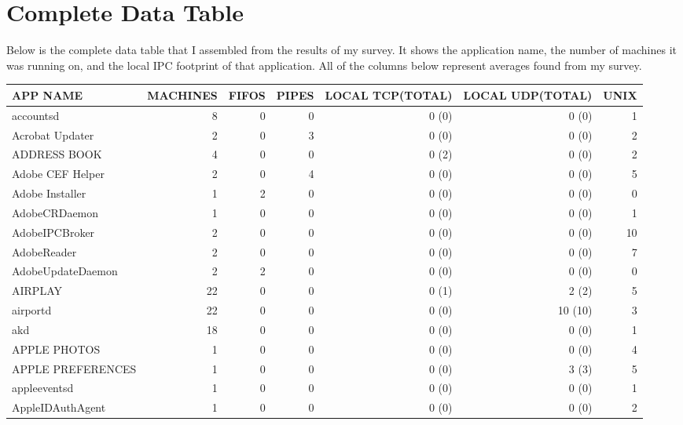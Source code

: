 \chapter{Complete Data Table}
\label{appendix:allData}
Below is the complete data table that I assembled from the results of my survey.  It shows the application name, the number of machines it was running on, and the local IPC footprint of that application.  All of the columns below represent averages found from my survey.


\setlength\LTleft{-1in}
\setlength{\tabcolsep}{3.4pt}
\begin{adjustwidth}{-2in}{}
\begin{scriptsize}
\begin{longtable}[l]{ l | r | r | r | r | r | r }
    \hline
    APP NAME &  MACHINES &  FIFOS &  PIPES & LOCAL TCP(TOTAL) & LOCAL UDP(TOTAL) & UNIX \\ \hline
    \endhead
    accountsd &  8 &  0 &  0 &  0 (0) &  0 (0) &  1 \\ \hline
    Acrobat Updater & 2 &  0 &  3 &  0 (0) &  0 (0) &  2 \\ \hline
    ADDRESS BOOK & 4 &  0 &  0 &  0 (2) &  0 (0) &  2 \\ \hline
    Adobe CEF Helper & 2 &  0 &  4 &  0 (0) &  0 (0) &  5 \\ \hline
    Adobe Installer & 1 &  2 &  0 &  0 (0) &  0 (0) &  0 \\ \hline
    AdobeCRDaemon &  1 &  0 &  0 &  0 (0) &  0 (0) &  1 \\ \hline
    AdobeIPCBroker & 2 &  0 &  0 &  0 (0) &  0 (0) & 10 \\ \hline
    AdobeReader &  2 &  0 &  0 &  0 (0) &  0 (0) &  7 \\ \hline
    AdobeUpdateDaemon &  2 &  2 &  0 &  0 (0) &  0 (0) &  0 \\ \hline
    AIRPLAY & 22 &  0 &  0 &  0 (1) &  2 (2) &  5 \\ \hline
    airportd &  22 &  0 &  0 &  0 (0) &  10 (10) &  3 \\ \hline
    akd & 18 &  0 &  0 &  0 (0) &  0 (0) &  1 \\ \hline
    APPLE PHOTOS & 1 &  0 &  0 &  0 (0) &  0 (0) &  4 \\ \hline
    APPLE PREFERENCES &  1 &  0 &  0 &  0 (0) &  3 (3) &  5 \\ \hline
    appleeventsd & 1 &  0 &  0 &  0 (0) &  0 (0) &  1 \\ \hline
    AppleIDAuthAgent & 1 &  0 &  0 &  0 (0) &  0 (0) &  2 \\ \hline

\end{longtable}
\end{scriptsize}
\end{adjustwidth}
